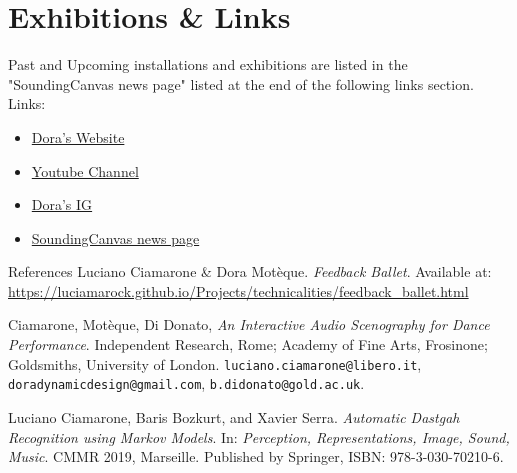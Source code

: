 \documentclass{article}
\begin{document}
\section{Exhibitions \& Links}
Past and Upcoming installations and exhibitions are listed in the "SoundingCanvas news page" listed at the end of the following links section. \newline
\newline
Links: 
\begin{itemize}
	\item \href{https://doramoteque-faf94c.webflow.io/}{Dora's Website}
	\item \href{https://www.youtube.com/@doradynamicdesign}{Youtube Channel}
	\item \href{https://www.instagram.com/doramoteque/}{Dora's IG}
	\item \href{https://luciamarock.github.io/news/soundingcanvas.html}{SoundingCanvas news page}
\end{itemize}

\newpage
\begin{thebibliography}{References}
	Luciano Ciamarone \& Dora Motèque. 
	\textit{Feedback Ballet}.  
	Available at: \url{https://luciamarock.github.io/Projects/technicalities/feedback_ballet.html}  	
	
	Ciamarone, Motèque, Di Donato,
	\textit{An Interactive Audio Scenography for Dance Performance}.  
	Independent Research, Rome; Academy of Fine Arts, Frosinone; Goldsmiths, University of London.  
	\texttt{luciano.ciamarone@libero.it}, \texttt{doradynamicdesign@gmail.com}, \texttt{b.didonato@gold.ac.uk}.
	
	Luciano Ciamarone, Baris Bozkurt, and Xavier Serra. 
	\textit{Automatic Dastgah Recognition using Markov Models}. 
	In: \textit{Perception, Representations, Image, Sound, Music}. 
	CMMR 2019, Marseille. Published by Springer, ISBN: 978-3-030-70210-6.
	
\end{thebibliography}
\end{document}
